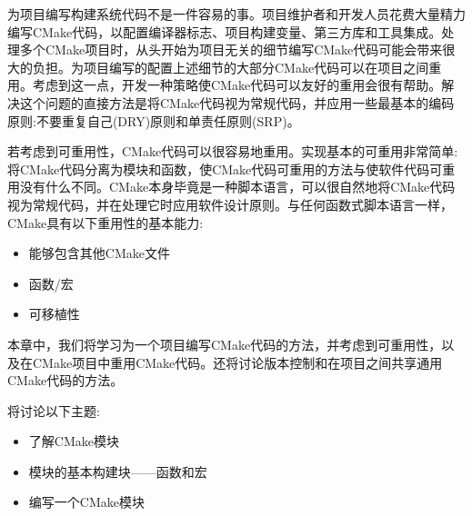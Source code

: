 
为项目编写构建系统代码不是一件容易的事。项目维护者和开发人员花费大量精力编写CMake代码，以配置编译器标志、项目构建变量、第三方库和工具集成。处理多个CMake项目时，从头开始为项目无关的细节编写CMake代码可能会带来很大的负担。为项目编写的配置上述细节的大部分CMake代码可以在项目之间重用。考虑到这一点，开发一种策略使CMake代码可以友好的重用会很有帮助。解决这个问题的直接方法是将CMake代码视为常规代码，并应用一些最基本的编码原则:不要重复自己(DRY)原则和单责任原则(SRP)。

若考虑到可重用性，CMake代码可以很容易地重用。实现基本的可重用非常简单:将CMake代码分离为模块和函数，使CMake代码可重用的方法与使软件代码可重用没有什么不同。CMake本身毕竟是一种脚本语言，可以很自然地将CMake代码视为常规代码，并在处理它时应用软件设计原则。与任何函数式脚本语言一样，CMake具有以下重用性的基本能力:

\begin{itemize}
\item 
能够包含其他CMake文件

\item 
函数/宏

\item 
可移植性
\end{itemize}

本章中，我们将学习为一个项目编写CMake代码的方法，并考虑到可重用性，以及在CMake项目中重用CMake代码。还将讨论版本控制和在项目之间共享通用CMake代码的方法。

将讨论以下主题:

\begin{itemize}
\item 
了解CMake模块

\item 
模块的基本构建块——函数和宏

\item 
编写一个CMake模块
\end{itemize}
